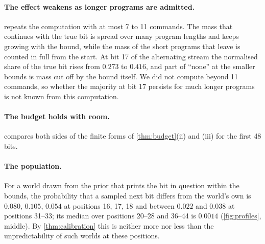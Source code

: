 \paragraph{The effect weakens as longer programs are admitted.}  repeats the computation
with at most 7 to 11 commands. The mass that continues with the true bit is spread over many program lengths
and keeps growing with the bound, while the mass of the short programs that leave is counted in full from the
start. At bit 17 of the alternating stream the normalised share of the true bit rises from $0.273$ to $0.416$,
and part of ``none'' at the smaller bounds is mass cut off by the bound itself. We did not compute beyond 11
commands, so whether the majority at bit 17 persists for much longer programs is not known from this
computation.

\begin{table}[ht]\centering\small

\caption{The two headline positions under different bounds on the number of commands, $T(k)=24k$.}\label{tab:length}
\end{table}

\paragraph{The budget holds with room.}  compares both sides of the finite forms of
\cref{thm:budget}(ii) and (iii) for the first 48 bits.

\begin{table}[ht]\centering\small

\caption{The budget inequalities for $T(k)=24k$ and at most 10 commands, with $\xi(z_{1:48})$ in place of the
limit: ``true$_k$'' is $\xi(z_k\mid z_{1:k-1})$.}\label{tab:budget}
\end{table}

\paragraph{The population.} For a world drawn from the prior that prints the bit in question within the
bounds, the probability that a sampled next bit differs from the world's own is $0.080$, $0.105$, $0.054$ at
positions 16, 17, 18 and between $0.022$ and $0.038$ at positions 31--33; its median over positions 20--28 and
36--44 is $0.0014$ (\cref{fig:profiles}, middle). By \cref{thm:calibration} this is neither more nor less than
the unpredictability of such worlds at these positions.

